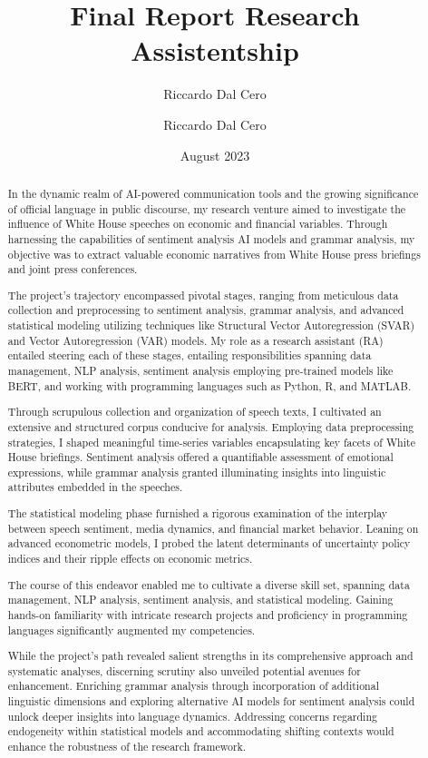 \documentclass{article}
\author{Riccardo Dal Cero}
\date{August 2023}
\title{Final Report Research Assistentship}
\author{Riccardo Dal Cero}
\begin{document}
\maketitle

\begin{abstract}

In the dynamic realm of AI-powered communication tools and the growing significance of official language in public discourse, my research venture aimed to investigate the influence of White House speeches on economic and financial variables. Through harnessing the capabilities of sentiment analysis AI models and grammar analysis, my objective was to extract valuable economic narratives from White House press briefings and joint press conferences.
 
The project's trajectory encompassed pivotal stages, ranging from meticulous data collection and preprocessing to sentiment analysis, grammar analysis, and advanced statistical modeling utilizing techniques like Structural Vector Autoregression (SVAR) and Vector Autoregression (VAR) models. My role as a research assistant (RA) entailed steering each of these stages, entailing responsibilities spanning data management, NLP analysis, sentiment analysis employing pre-trained models like BERT, and working with programming languages such as Python, R, and MATLAB.
 
Through scrupulous collection and organization of speech texts, I cultivated an extensive and structured corpus conducive for analysis. Employing data preprocessing strategies, I shaped meaningful time-series variables encapsulating key facets of White House briefings. Sentiment analysis offered a quantifiable assessment of emotional expressions, while grammar analysis granted illuminating insights into linguistic attributes embedded in the speeches.
 
The statistical modeling phase furnished a rigorous examination of the interplay between speech sentiment, media dynamics, and financial market behavior. Leaning on advanced econometric models, I probed the latent determinants of uncertainty policy indices and their ripple effects on economic metrics.
 
The course of this endeavor enabled me to cultivate a diverse skill set, spanning data management, NLP analysis, sentiment analysis, and statistical modeling. Gaining hands-on familiarity with intricate research projects and proficiency in programming languages significantly augmented my competencies.
 
While the project's path revealed salient strengths in its comprehensive approach and systematic analyses, discerning scrutiny also unveiled potential avenues for enhancement. Enriching grammar analysis through incorporation of additional linguistic dimensions and exploring alternative AI models for sentiment analysis could unlock deeper insights into language dynamics. Addressing concerns regarding endogeneity within statistical models and accommodating shifting contexts would enhance the robustness of the research framework.
 

\end{abstract}
\end{document}

